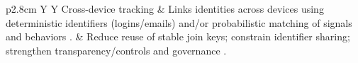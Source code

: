 \begin{table}[t]
\begin{tabularx}{\textwidth}{p{2.8cm} Y Y}
Cross-device tracking &
Links identities across devices using deterministic identifiers (logins/emails) and/or probabilistic matching of signals and behaviors \cite{diaz-moralesCrossDeviceTrackingMatching2015,brookmanCrossDeviceTrackingMeasurement2017,zimmeckPrivacyAnalysisCrossdevice2017,wangGraphTrackGraphbasedCrossDevice2022}. &
Reduce reuse of stable join keys; constrain identifier sharing; strengthen transparency/controls and governance \cite{brookmanCrossDeviceTrackingMeasurement2017,zimmeckPrivacyAnalysisCrossdevice2017}. \\

\bottomrule
\end{tabularx}
\end{table}